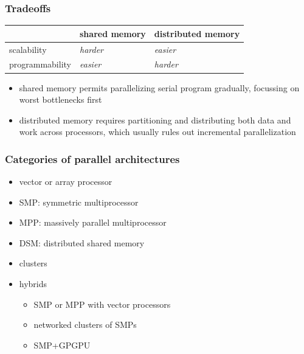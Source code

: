 \begin{frame}[fragile]
%
  \frametitle{Tradeoffs}
%
  \begin{center}
    \begin{minipage}{.75\linewidth}
      \begin{tabular}{l|l|l}
                        & shared memory & distributed memory \\ \hline
        scalability     & {\em harder}  & {\em easier} \\
        programmability & {\em easier}  & {\em harder}
      \end{tabular}
    \end{minipage}
  \end{center}

%
  \begin{itemize}
%
  \item shared memory permits parallelizing serial program gradually, focussing on worst
    bottlenecks first
%
  \item distributed memory requires partitioning and distributing both data and work across
    processors, which usually rules out incremental parallelization
%
  \end{itemize}
%
\end{frame}

\begin{frame}[fragile]
%
  \frametitle{Categories of parallel architectures}
%
  \begin{itemize}
%
  \item vector or array processor
  \item SMP: symmetric multiprocessor
  \item MPP: massively parallel multiprocessor
  \item DSM: distributed shared memory
  \item clusters
  \item hybrids
    \begin{itemize}
      \item SMP or MPP with vector processors
      \item networked clusters of SMPs
      \item SMP+GPGPU 
    \end{itemize}
%
  \end{itemize}
%
\end{frame}

